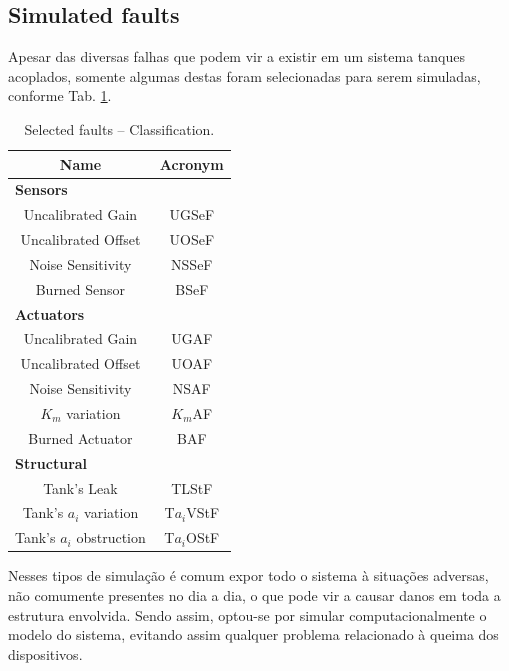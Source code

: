 \documentclass[10pt,fleqn,a4paper]{article}
\begin{document}
\subsection{Simulated faults}
Apesar das diversas falhas que podem vir a existir em um sistema tanques
acoplados, somente algumas destas foram selecionadas para serem simuladas,
conforme Tab. \ref{tab:faults}.

\begin{table}[!htb]
\centering
\caption{Selected faults -- Classification.}
\label{tab:faults}
\begin{tabular}{|c|c|}
\hline
{\bf Name} & {\bf Acronym}\\
\hline
\multicolumn{2}{|l|}{\bf Sensors}\\
\hline
Uncalibrated Gain & UGSeF\\
\hline
Uncalibrated Offset & UOSeF\\
\hline
Noise Sensitivity & NSSeF\\
\hline
Burned Sensor & BSeF\\
\hline
\multicolumn{2}{|l|}{\bf Actuators}\\
\hline
Uncalibrated Gain & UGAF\\
\hline
Uncalibrated Offset & UOAF\\
\hline
Noise Sensitivity & NSAF\\
\hline
$K_m$ variation & $K_m$AF\\
\hline
Burned Actuator & BAF\\
\hline
\multicolumn{2}{|l|}{\bf Structural}\\
\hline
Tank's Leak & TLStF\\
\hline
Tank's $a_i$ variation & T$a_i$VStF\\
\hline
Tank's $a_i$ obstruction & T$a_i$OStF\\
\hline
\end{tabular}
\end{table}

Nesses tipos de simulação é comum expor todo o sistema à situações adversas, não
comumente presentes no dia a dia, o que pode vir a causar danos em toda a
estrutura envolvida. Sendo assim, optou-se por simular computacionalmente o
modelo do sistema, evitando assim qualquer problema relacionado à queima dos
dispositivos.

\end{document}
